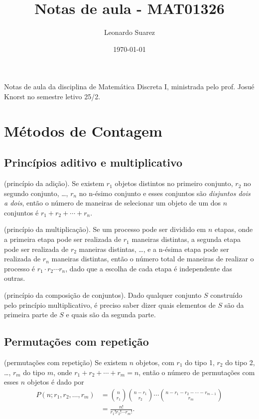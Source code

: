 \documentclass{article}
\title{Notas de aula - MAT01326}
\author{Leonardo Suarez}
\date{\today}
\begin{document}
\maketitle

Notas de aula da disciplina de Matemática Discreta I, ministrada pelo prof. Josué Knorst no semestre letivo 25/2.

\tableofcontents

\section{Métodos de Contagem}

\subsection{Princípios aditivo e multiplicativo}

\begin{thm} (princípio da adição).
    Se existem \(r_1\) objetos distintos no primeiro conjunto, \(r_2\) no segundo conjunto, \ldots, \(r_n\) no n-ésimo conjunto e esses conjuntos são \emph{disjuntos dois a dois}, então o número de maneiras de selecionar um objeto de um dos \(n\) conjuntos é \(r_1 + r_2 + \cdots + r_n\).
\end{thm}

\begin{thm} (princípio da multiplicação).
    Se um processo pode ser dividido em \(n\) etapas, onde a primeira etapa pode ser realizada de \(r_1\) maneiras distintas, a segunda etapa pode ser realizada de \(r_2\) maneiras distintas, \ldots, e a n-ésima etapa pode ser realizada de \(r_n\) maneiras distintas, então o número total de maneiras de realizar o processo é \(r_1 \cdot r_2 \cdots r_n\), dado que a escolha de cada etapa é independente das outras.
\end{thm}

\begin{thm} (princípio da composição de conjuntos).
    Dado qualquer conjunto \(S\) construído pelo princípio multiplicativo, é preciso saber dizer quais elementos de \(S\) são da primeira parte de \(S\) e quais são da segunda parte.
\end{thm}

\subsection{Permutações com repetição}

\begin{thm} (permutações com repetição)
    Se existem \(n\) objetos, com \(r_1\) do tipo 1, \(r_2\) do tipo 2, \ldots, \(r_m\) do tipo \(m\), onde \(r_1 + r_2 + \cdots + r_m = n\), então o número de permutações com esses \(n\) objetos é dado por
    \begin{align}
        P(n;r_1,r_2,\ldots,r_m) &= \binom{n}{r_1}\binom{n-r_1}{r_2}\cdots\binom{n-r_1-r_2-\cdots-r_{m-1}}{r_m} \\
        &= \frac{n!}{r_1!r_2!\cdots r_m!}.
    \end{align}
\end{thm}
\end{document}
